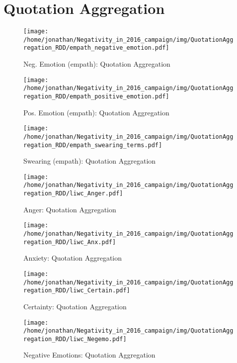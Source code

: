 \section{Quotation Aggregation}

\begin{figure}[h]\centering
\texttt{[image: /home/jonathan/Negativity\_in\_2016\_campaign/img/QuotationAggregation\_RDD/empath\_negative\_emotion.pdf]}
\caption{Neg. Emotion (empath): Quotation Aggregation}
\label{fig: qa_Neg. Emotion (empath)}
\end
{figure}

\begin{figure}[h]\centering
\texttt{[image: /home/jonathan/Negativity\_in\_2016\_campaign/img/QuotationAggregation\_RDD/empath\_positive\_emotion.pdf]}
\caption{Pos. Emotion (empath): Quotation Aggregation}
\label{fig: qa_Pos. Emotion (empath)}
\end
{figure}

\begin{figure}[h]\centering
\texttt{[image: /home/jonathan/Negativity\_in\_2016\_campaign/img/QuotationAggregation\_RDD/empath\_swearing\_terms.pdf]}
\caption{Swearing (empath): Quotation Aggregation}
\label{fig: qa_Swearing (empath)}
\end
{figure}

\begin{figure}[h]\centering
\texttt{[image: /home/jonathan/Negativity\_in\_2016\_campaign/img/QuotationAggregation\_RDD/liwc\_Anger.pdf]}
\caption{Anger: Quotation Aggregation}
\label{fig: qa_Anger}
\end
{figure}

\begin{figure}[h]\centering
\texttt{[image: /home/jonathan/Negativity\_in\_2016\_campaign/img/QuotationAggregation\_RDD/liwc\_Anx.pdf]}
\caption{Anxiety: Quotation Aggregation}
\label{fig: qa_Anxiety}
\end
{figure}

\begin{figure}[h]\centering
\texttt{[image: /home/jonathan/Negativity\_in\_2016\_campaign/img/QuotationAggregation\_RDD/liwc\_Certain.pdf]}
\caption{Certainty: Quotation Aggregation}
\label{fig: qa_Certainty}
\end
{figure}

\begin{figure}[h]\centering
\texttt{[image: /home/jonathan/Negativity\_in\_2016\_campaign/img/QuotationAggregation\_RDD/liwc\_Negemo.pdf]}
\caption{Negative Emotions: Quotation Aggregation}
\label{fig: qa_Negative Emotions}
\end
{figure}

